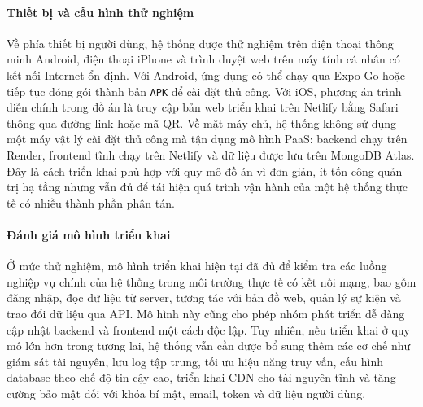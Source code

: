 \documentclass[../DoAn.tex]{subfiles}
\begin{document}
\paragraph{Thiết bị và cấu hình thử nghiệm}\mbox{}

Về phía thiết bị người dùng, hệ thống được thử nghiệm trên điện thoại thông minh Android, điện thoại iPhone và trình duyệt web trên máy tính cá nhân có kết nối Internet ổn định. Với Android, ứng dụng có thể chạy qua Expo Go hoặc tiếp tục đóng gói thành bản \texttt{APK} để cài đặt thủ công. Với iOS, phương án trình diễn chính trong đồ án là truy cập bản web triển khai trên Netlify bằng Safari thông qua đường link hoặc mã \gls{QR}. Về mặt máy chủ, hệ thống không sử dụng một máy vật lý cài đặt thủ công mà tận dụng mô hình \gls{PaaS}: backend chạy trên Render, frontend tĩnh chạy trên Netlify và dữ liệu được lưu trên MongoDB Atlas. Đây là cách triển khai phù hợp với quy mô đồ án vì đơn giản, ít tốn công quản trị hạ tầng nhưng vẫn đủ để tái hiện quá trình vận hành của một hệ thống thực tế có nhiều thành phần phân tán.

\paragraph{Đánh giá mô hình triển khai}\mbox{}

Ở mức thử nghiệm, mô hình triển khai hiện tại đã đủ để kiểm tra các luồng nghiệp vụ chính của hệ thống trong môi trường thực tế có kết nối mạng, bao gồm đăng nhập, đọc dữ liệu từ server, tương tác với bản đồ web, quản lý sự kiện và trao đổi dữ liệu qua \gls{API}. Mô hình này cũng cho phép nhóm phát triển dễ dàng cập nhật backend và frontend một cách độc lập. Tuy nhiên, nếu triển khai ở quy mô lớn hơn trong tương lai, hệ thống vẫn cần được bổ sung thêm các cơ chế như giám sát tài nguyên, lưu log tập trung, tối ưu hiệu năng truy vấn, cấu hình database theo chế độ tin cậy cao, triển khai \gls{CDN} cho tài nguyên tĩnh và tăng cường bảo mật đối với khóa bí mật, email, token và dữ liệu người dùng.
\end{document}

